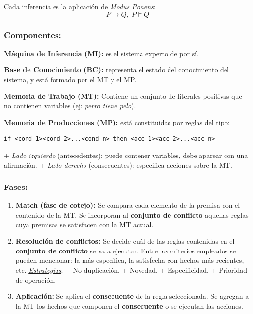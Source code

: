 \documentclass[10pt,a4paper]{article}
\begin{document}
Cada inferencia es la aplicación de \textit{Modus Ponens}:
\[P \rightarrow Q, \; P \models Q\]

\subsubsection{Componentes:}
\begin{description}
\item \textbf{Máquina de Inferencia (MI):} es el sistema experto de por sí.
\item \textbf{Base de Conocimiento (BC):} representa el estado del conocimiento del sistema, y está formado por el MT y el MP.
\item \textbf{Memoria de Trabajo (MT):} Contiene un conjunto de literales positivas que no contienen variables (ej: \textit{perro tiene pelo}).
\item \textbf{Memoria de Producciones (MP):} está constituidas por reglas del tipo:
\begin{verbatim}
if <cond 1><cond 2>...<cond n> then <acc 1><acc 2>...<acc n>
\end{verbatim}
\subitem + \textit{Lado izquierdo} (antecedentes): puede contener variables, debe aparear con una afirmación.
\subitem + \textit{Lado derecho} (consecuentes): especifica acciones sobre la MT.
\end{description}

\subsubsection{Fases:}
\begin{enumerate}
\item \textbf{Match (fase de cotejo):} Se compara cada elemento de la premisa con el contenido de la MT. Se incorporan al \textbf{conjunto de conflicto} aquellas reglas cuya premisas se satisfacen con la MT actual.
\item \textbf{Resolución de conflictos:} Se decide cuál de las reglas contenidas en el \textbf{conjunto de conflicto} se va a ejecutar. Entre los criterios empleados se pueden mencionar: la más específica, la satisfecha con hechos más recientes, etc. 
\subitem \underline{\textit{Estrategias}}:
\subitem + No duplicación.
\subitem + Novedad.
\subitem + Especificidad.
\subitem + Prioridad de operación.
\item \textbf{Aplicación:} Se aplica el \textbf{consecuente} de la regla seleccionada. Se agregan a la MT los hechos que componen el \textbf{consecuente} o se ejecutan las acciones.
\end{enumerate}
\end{document}
